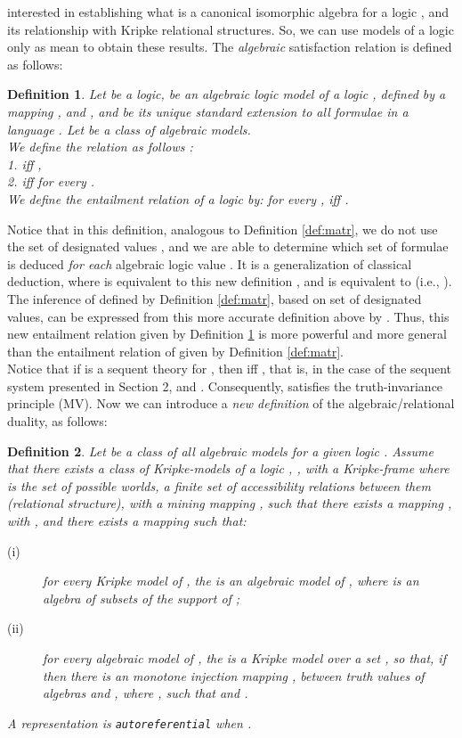 \documentclass[10pt,twocolumn]{article}
\newtheorem{definition}{Definition}
\begin{document}
interested in establishing what is a canonical isomorphic algebra
for a logic , and its relationship with Kripke relational
structures. So, we can use models  of a logic
 only as mean to obtain these results.
 The \emph{algebraic} satisfaction relation
 is defined as follows:
\begin{definition} \label{def:newalg} Let  be a logic,  be an algebraic logic model
of a logic , defined by a mapping , and
, and  be its
unique standard extension to all formulae in a language . Let
 be a class of algebraic models.\\ We define the
relation  as follows :\\
1.  iff ,\\
2.  iff 
for every .\\
We define the entailment relation of a logic  by:  for every
,
  iff .
\end{definition}
Notice that in this definition, analogous to Definition
\ref{def:matr}, we do not use the set of designated values , and
we are able to determine which set of formulae is deduced \emph{for
each} algebraic logic value . It is a generalization of
classical deduction, where  is equivalent to this
new definition , and  is
equivalent to  (i.e., ).
The inference  of  defined by Definition \ref{def:matr}, based
on set  of designated values, can be expressed from this more
accurate definition above by  .
Thus, this new entailment relation  given by Definition
\ref{def:newalg} is more powerful and more general than the
entailment relation of  given by Definition \ref{def:matr}.
\\Notice that if  is a sequent theory for , then  iff
,
that is, in the case of the sequent system presented in Section 2,  and  . Consequently,
 satisfies the truth-invariance principle (MV).
 Now we can introduce a \emph{new definition} of the
algebraic/relational duality, as follows:
\begin{definition} \label{def:abs1}
Let  be a class of all algebraic models for a given logic .
Assume that there exists a class  of Kripke-models of a
logic , , with a Kripke-frame  where 
is the set of possible worlds,  a finite set of
accessibility relations between them (relational structure), with a
mining mapping ,  such that there
exists a mapping , with , and there exists
a mapping  such that:
\begin{description}
                            \item[(i)] for every \emph{Kripke} model  of
                            ,
                            the  is an algebraic model of , where  is an algebra
                            of subsets of the support  of ;
                            \item[(ii)] for every \emph{algebraic} model  of , the  is a Kripke model over a set
                            , so that, if  then there is an
                            monotone injection mapping , between truth values of algebras 
                             and , where ,
                              such that   and .
\end{description}
A representation is \verb"autoreferential" when .
\end{definition}
\end{document}
